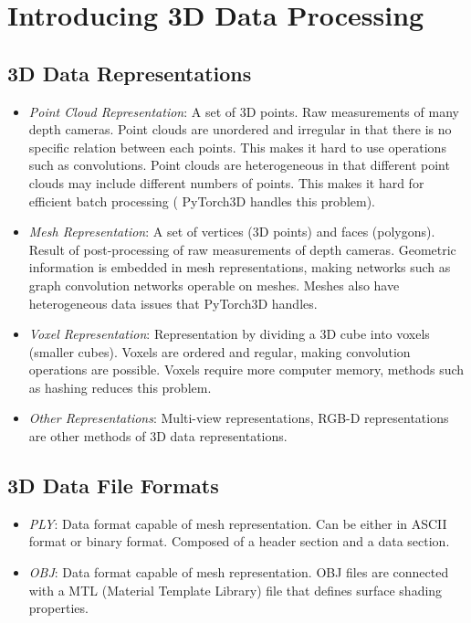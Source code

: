 \chapter{Introducing 3D Data Processing}

\section{3D Data Representations}
\begin{itemize}
    \item{
        \emph{Point Cloud Representation}:
        A set of 3D points.
        Raw measurements of many depth cameras.
        Point clouds are unordered and irregular in that there is no specific relation
        between each points. This makes it hard to use operations such as convolutions.
        Point clouds are heterogeneous in that different point clouds may include different
        numbers of points. This makes it hard for efficient batch processing (
        PyTorch3D handles this problem).
    }
    \item{
        \emph{Mesh Representation}:
        A set of vertices (3D points) and faces (polygons).
        Result of post-processing of raw measurements of depth cameras.
        Geometric information is embedded in mesh representations, making networks such
        as graph convolution networks operable on meshes.
        Meshes also have heterogeneous data issues that PyTorch3D handles.
    }
    \item{
        \emph{Voxel Representation}:
        Representation by dividing a 3D cube into voxels (smaller cubes).
        Voxels are ordered and regular, making convolution operations are possible.
        Voxels require more computer memory, methods such as hashing reduces this problem.
    }
    \item{
        \emph{Other Representations}:
        Multi-view representations, RGB-D representations are other methods of
        3D data representations.
    }
\end{itemize}

\section{3D Data File Formats}
\begin{itemize}
    \item{
        \emph{PLY}:
        Data format capable of mesh representation. Can be either in ASCII format
        or binary format. Composed of a header section and a data section.
    }
    \item{
        \emph{OBJ}:
        Data format capable of mesh representation. OBJ files are connected with a MTL
        (Material Template Library) file that defines surface shading properties.
    }
\end{itemize}

